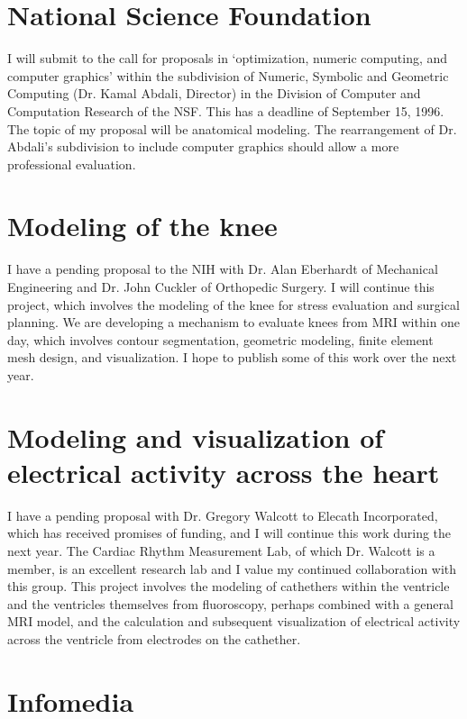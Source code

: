\section{National Science Foundation}

I will submit to the call for proposals in
`optimization, numeric computing, and computer graphics' within the subdivision
of Numeric, Symbolic and Geometric Computing (Dr. Kamal Abdali, Director)
in the Division of Computer and Computation Research of the NSF.
This has a deadline of September 15, 1996.
The topic of my proposal will be anatomical modeling.
The rearrangement of Dr. Abdali's subdivision to include computer graphics
should allow a more professional evaluation.

\section{Modeling of the knee}

I have a pending proposal to the NIH with Dr. Alan Eberhardt of
Mechanical Engineering and Dr. John Cuckler of Orthopedic Surgery.
I will continue this project, which involves the modeling of the knee
for stress evaluation and surgical planning.
We are developing a mechanism to evaluate knees from MRI within one day,
which involves contour segmentation, geometric modeling, finite element
mesh design, and visualization.
I hope to publish some of this work over the next year.

\section{Modeling and visualization of electrical activity across the heart}

I have a pending proposal with Dr. Gregory Walcott to Elecath Incorporated,
which has received promises of funding, and I will continue this work
during the next year.
The Cardiac Rhythm Measurement Lab, of which Dr. Walcott is a member, 
is an excellent research lab and I value my continued collaboration
with this group.
This project involves the modeling of cathethers within the ventricle
and the ventricles themselves from fluoroscopy,
perhaps combined with a general MRI model, and the calculation and subsequent
visualization of electrical activity across the ventricle from electrodes
on the cathether.

\section{Infomedia}

